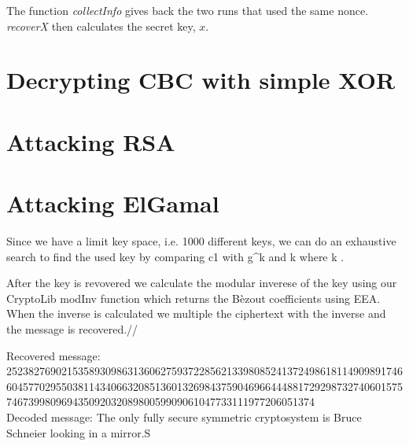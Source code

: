 \documentclass{article}
\begin{document}
The function \textit{collectInfo} gives back the two runs that used the same
nonce. \textit{recoverX} then calculates the
secret key, $x$.

\section{Decrypting CBC with simple XOR}


\section{Attacking RSA}

\section{Attacking ElGamal}
Since we have a limit key space, i.e. 1000 different keys,  we can do an exhaustive search to find the used key by comparing c1 with g^k and k where k .

After the key is revovered we calculate the modular inverese of the key using our CryptoLib modInv function which returns the Bèzout coefficients using EEA.
When the inverse is calculated we multiple the ciphertext with the inverse and the message is recovered.//

Recovered message: 25238276902153589309863136062759372285621339808524137249861811490989174660457702955038114340663208513601326984375904696644488172929873274060157574673998096943509203208980059909061047733111977206051374 \\
Decoded message: The only fully secure symmetric cryptosystem is Bruce Schneier looking in a mirror.S       
\end{document}
